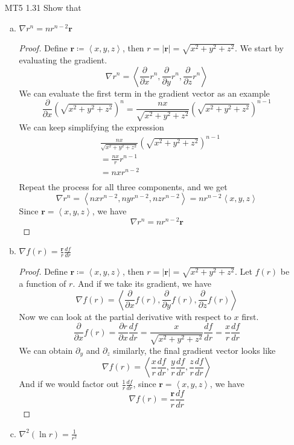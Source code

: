 \documentclass[12pt]{article}
\newcommand{\pypx}[2]{\frac{\partial #1}{\partial #2}}
\newcommand{\dydx}[2]{\frac{d #1}{d #2}}
\newcommand{\paren}[1]{\left( #1 \right)}
\newcommand{\tribkt}[1]{\left< #1 \right>}
\newcommand{\abso}[1]{\left|#1 \right|}
\begin{document}
\begin{enumerate}
        \item[MT5 1.31] Show that
        \begin{enumerate}[(a)]
            \item \(\nabla r^n = nr^{n-2}\mathbf{r}\)

            \begin{proof} Define $\mathbf{r}\coloneqq \tribkt{x,y,z}$, then $r = \abso{\mathbf{r}} = \sqrt{x^2 + y^2 + z^2}$. We start by evaluating the gradient.
                \[
                \nabla r^n = \tribkt{\pypx{}{x}r^n, \pypx{}{y}r^n, \pypx{}{z}r^n}
                \]
                We can evaluate the first term in the gradient vector as an example 
                \[
                \pypx{}{x}\paren{\sqrt{x^2 + y^2 + z^2} }^n= \frac{nx}{\sqrt{x^2 + y^2 + z^2}}\paren{\sqrt{x^2 + y^2 + z^2} }^{n-1}
                \]
                We can keep simplifying the expression
                \begin{align*}
                &\frac{nx}{\sqrt{x^2 + y^2 + z^2}}\paren{\sqrt{x^2 + y^2 + z^2} }^{n-1} \\
                &= \frac{nx}{r}r^{n-1}\\
                &= nxr^{n-2}\\
                \end{align*}
                Repeat the process for all three components, and we get
                \[
                 \nabla r^n = \tribkt{nxr^{n-2},nyr^{n-2},nzr^{n-2}} = nr^{n-2}\tribkt{x,y,z}
                \]
                Since $\mathbf{r} = \tribkt{x,y,z}$, we have
                \[
                \nabla r^n = nr^{n-2}\mathbf{r}
                \]
            \end{proof}
            
            \item \( \nabla f(r) = \frac{\mathbf{r}}{r}\dydx{f}{r} \)

            \begin{proof}
                Define $\mathbf{r}\coloneqq \tribkt{x,y,z}$, then $r = \abso{\mathbf{r}} = \sqrt{x^2 + y^2 + z^2}$. Let $f(r)$ be a function of $r$. And if we take its gradient, we have
                \[
                \nabla f(r) = \tribkt{\pypx{}{x}f(r), \pypx{}{y}f(r),\pypx{}{z}f(r)}
                \]
                Now we can look at the partial derivative with respect to $x$ first.
                \[
                \pypx{}{x}f(r) = \pypx{r}{x}\dydx{f}{r} =\frac{x}{\sqrt{x^2 + y^2 + z^2}}\dydx{f}{r} = \frac{x}{r}\dydx{f}{r}
                \]
                We can obtain $\partial_y$ and $\partial_z$ similarly, the final gradient vector looks like
                \[
                \nabla f(r) = \tribkt{\frac{x}{r}\dydx{f}{r},\frac{y}{r}\dydx{f}{r},\frac{z}{r}\dydx{f}{r}}
                \]
                And if we would factor out $\frac{1}{r}\dydx{f}{r}$, since $\mathbf{r}=\tribkt{x,y,z}$, we have
                \[
                \nabla f(r) = \frac{\mathbf{r}}{r}\dydx{f}{r}
                \]
            \end{proof}
            \item \( \nabla^2\paren{\ln r} = \frac{1}{r^2} \)


\end{enumerate}
\end{enumerate}
\end{document}
